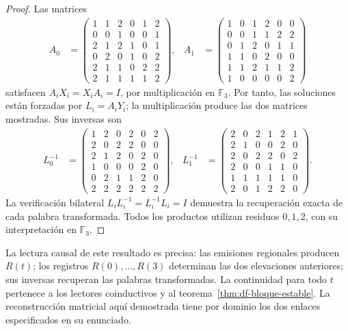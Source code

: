 \begin{proof}
Las matrices
\begin{align*}
 A_0&=\begin{pmatrix}
1&1&2&0&1&2\\0&0&1&0&0&1\\2&1&2&1&0&1\\
0&2&0&1&0&2\\2&1&1&0&2&2\\2&1&1&1&1&2
\end{pmatrix},&
 A_1&=\begin{pmatrix}
1&0&1&2&0&0\\0&0&1&1&2&2\\0&1&2&0&1&1\\
1&1&0&2&0&0\\1&1&2&1&1&2\\1&0&0&0&0&2
\end{pmatrix}
\end{align*}
satisfacen \(A_iX_i=X_iA_i=I\), por multiplicación en \(\mathbb F_3\).
Por tanto, las soluciones están forzadas por \(L_i=A_iY_i\); la
multiplicación produce las dos matrices mostradas. Sus inversas son
\begin{align*}
 L_0^{-1}&=\begin{pmatrix}
1&2&0&2&0&2\\2&0&2&2&0&0\\2&1&2&0&2&0\\
1&0&0&0&2&0\\0&2&1&1&2&0\\2&2&2&2&2&2
\end{pmatrix},&
 L_1^{-1}&=\begin{pmatrix}
2&0&2&1&2&1\\2&1&0&0&2&0\\2&0&2&2&0&2\\
2&0&0&1&1&0\\1&1&1&1&1&0\\2&0&1&2&2&0
\end{pmatrix}.
\end{align*}
La verificación bilateral \(L_iL_i^{-1}=L_i^{-1}L_i=I\) demuestra la
recuperación exacta de cada palabra transformada. Todos los productos
utilizan residuos \(0,1,2\), con su interpretación en \(\mathbb F_3\).
\end{proof}

La lectura causal de este resultado es precisa: las emisiones regionales
producen \(R(t)\); los registros \(R(0),\ldots,R(3)\) determinan las dos
elevaciones anteriores; sus inversas recuperan las palabras transformadas.
La continuidad para todo \(t\) pertenece a los lectores coinductivos y al
teorema~\ref{thm:df-bloque-estable}. La reconstrucción matricial aquí
demostrada tiene por dominio los dos enlaces especificados en su enunciado.

